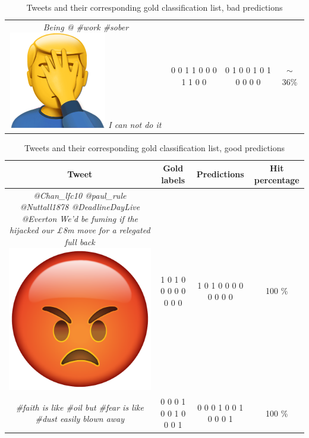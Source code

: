 \begin{table}[H]
\begin{tabular}{c|c|c|c|}
\parbox[t]{6cm}{\textit{Being @ \#work \#sober \includegraphics[scale=0.07]{pictures/man_facepalm_emoji.png}
 I can not do it}} & 0 0 1 1 0 0 0 1 1 0 0 & 0 1 0 0 1 0 1 0 0 0 0 & $\sim$ 36\% \\
\end{tabular}
\caption{Tweets and their corresponding gold classification list, bad predictions}
\label{tab:classerrorhigh}
\end{table}
\begin{table}[H]
\begin{tabular}{c|c|c|c|}
Tweet & Gold labels & Predictions & Hit percentage \\ \hline
\parbox[t]{6cm}{\textit{@Chan\_lfc10 @paul\_rule @Nuttall1878 @DeadlineDayLive @Everton We'd be fuming if the hijacked our £8m move for a relegated full back \includegraphics[scale=0.015]{pictures/very_angry_emoji.png}}} & 1 0 1 0 0 0 0 0 0 0 0 & 1 0 1 0 0 0 0 0 0 0 0 & 100 \% \\ \hline
\parbox[t]{6cm}{\textit{\#faith is like \#oil but \#fear is like \#dust easily blown away}} & 0 0 0 1 0 0 1 0 0 0 1 & 0 0 0 1 0 0 1 0 0 0 1 & 100 \% 
\end{tabular}
\caption{Tweets and their corresponding gold classification list, good predictions}
\label{tab:classerrorlow}
\end{table}
